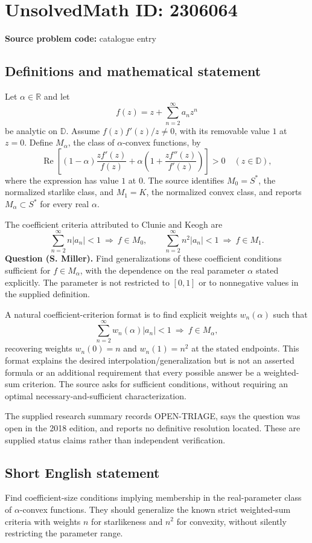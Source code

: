 \documentclass[11pt]{article}
\newcommand{\R}{\mathbb{R}}
\begin{document}
\section*{UnsolvedMath ID: 2306064}
\textbf{Source problem code:} catalogue entry
\subsection{Definitions and mathematical statement}
Let $\alpha\in\R$ and let
\[
 f(z)=z+\sum_{n=2}^{\infty}a_nz^n
\]
be analytic on $\mathbb D$. Assume $f(z)f'(z)/z\ne0$, with its removable value $1$ at $z=0$. Define $M_\alpha$, the class of $\alpha$-convex functions, by
\[
 \operatorname{Re}\left[(1-\alpha)\frac{zf'(z)}{f(z)}
       +\alpha\left(1+\frac{zf''(z)}{f'(z)}\right)\right]>0
 \quad(z\in\mathbb D),
\]
where the expression has value $1$ at $0$. The source identifies $M_0=S^*$, the normalized starlike class, and $M_1=K$, the normalized convex class, and reports $M_\alpha\subset S^*$ for every real $\alpha$.

The coefficient criteria attributed to Clunie and Keogh are
\[
 \sum_{n=2}^{\infty}n|a_n|<1\ \Longrightarrow\ f\in M_0,
 \qquad
 \sum_{n=2}^{\infty}n^2|a_n|<1\ \Longrightarrow\ f\in M_1.
\]
\textbf{Question (S. Miller).} Find generalizations of these coefficient conditions sufficient for $f\in M_\alpha$, with the dependence on the real parameter $\alpha$ stated explicitly. The parameter is not restricted to $[0,1]$ or to nonnegative values in the supplied definition.

A natural coefficient-criterion format is to find explicit weights $w_n(\alpha)$ such that
\[
 \sum_{n=2}^{\infty}w_n(\alpha)|a_n|<1\ \Longrightarrow\ f\in M_\alpha,
\]
recovering weights $w_n(0)=n$ and $w_n(1)=n^2$ at the stated endpoints. This format explains the desired interpolation/generalization but is not an asserted formula or an additional requirement that every possible answer be a weighted-sum criterion. The source asks for sufficient conditions, without requiring an optimal necessary-and-sufficient characterization.

The supplied research summary records OPEN-TRIAGE, says the question was open in the 2018 edition, and reports no definitive resolution located. These are supplied status claims rather than independent verification.
\subsection{Short English statement}
Find coefficient-size conditions implying membership in the real-parameter class of $\alpha$-convex functions. They should generalize the known strict weighted-sum criteria with weights $n$ for starlikeness and $n^2$ for convexity, without silently restricting the parameter range.
\end{document}
